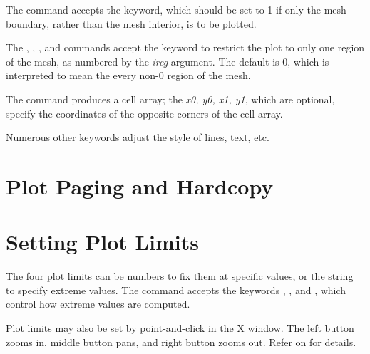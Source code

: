 The  command accepts the  keyword, which should be
set to 1 if only the mesh boundary, rather than the mesh interior, is to
be plotted.

The , , , and  commands accept the
 keyword to restrict the plot to only one region of the
mesh, as numbered by the {\it ireg\/} argument.  The default 
is 0, which is interpreted to mean the every non-0 region of the mesh.

The  command produces a cell array; the {\it x0, y0, x1, y1\/},
which are optional, specify the coordinates of the opposite corners of the
cell array.

Numerous other keywords adjust the style of lines, text, etc.

\section{Plot Paging and Hardcopy}


\section{Setting Plot Limits}



The four plot limits can be numbers to fix them at specific values, or
the string  to specify extreme values.  The 
command accepts the keywords , , and
, which control how extreme values are computed.

Plot limits may also be set by point-and-click in the X window.  The
left button zooms in, middle button pans, and right button zooms out.
Refer  on  for details.

